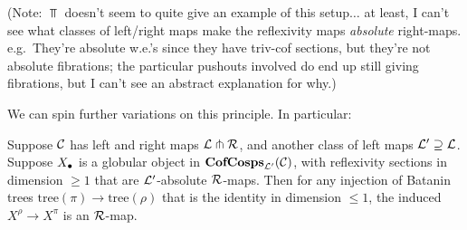 \documentclass{amsart}
\newcommand{\tree}{\mathrm{tree}}
\begin{document}
(Note: $\Top$ doesn't seem to quite give an example of this setup$\ldots$ at least, I can't see what classes of left/right maps make the reflexivity maps \emph{absolute} right-maps.  e.g.\ They're absolute w.e.'s since they have triv-cof sections, but they're not absolute fibrations; the particular pushouts involved do end up still giving fibrations, but I can't see an abstract explanation for why.)

We can spin further variations on this principle.  In particular:

\begin{proposition}
Suppose $\mathcal{C}$ has left and right maps $\mathcal{L} \pitchfork \mathcal{R}$, and another class of left maps $\mathcal{L}' \supseteq \mathcal{L}$.  Suppose $X_\bullet$ is a globular object in $\mathbf{CofCosps}_{\mathcal{L}'}(\mathcal{C})$, with reflexivity sections in dimension $\geq 1$ that are $\mathcal{L}'$-absolute $\mathcal{R}$-maps.  Then for any injection of Batanin trees $\tree(\pi) \to \tree(\rho)$ that is the identity in dimension $\leq 1$, the induced $X^\rho \to X^\pi$ is an $\mathcal{R}$-map.
\end{proposition}


























\clearpage




\end{document}
